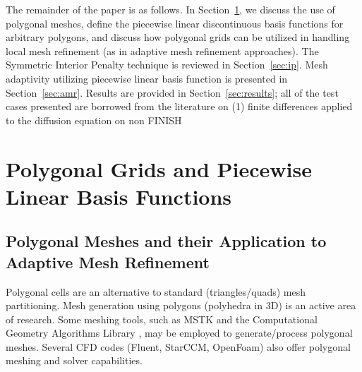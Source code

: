 \documentclass[preprint,10pt]{elsarticle}
\newcommand{\sct}[1]{Section~\ref{#1}}                   %
\begin{document}
The remainder of the paper is as follows. In \sct{sec:poly}, we discuss
the use of polygonal meshes, define the piecewise linear discontinuous 
basis functions for arbitrary polygons, and discuss how polygonal grids
can be utilized in handling local mesh refinement (as in adaptive mesh refinement 
approaches). The Symmetric Interior Penalty technique is reviewed in \sct{sec:ip}.
Mesh adaptivity utilizing piecewise linear basis function is presented in 
\sct{sec:amr}. Results are provided in \sct{sec:results}; all of the test cases presented
are borrowed from the literature on (1) finite differences applied to the
diffusion equation on non FINISH 

\section{Polygonal Grids and Piecewise Linear Basis Functions} \label{sec:poly}
\subsection{Polygonal Meshes and their Application to Adaptive Mesh Refinement}

Polygonal cells are an alternative to standard (triangles/quads) mesh partitioning.
Mesh generation using polygons (polyhedra in 3D) is an active area of research.
Some meshing tools, such as MSTK \cite{mstk} and the Computational Geometry Algorithms 
Library \cite{cgal}, may be employed to generate/process polygonal meshes.  
Several CFD codes (Fluent, StarCCM, OpenFoam) also offer polygonal meshing and solver capabilities. 
\end{document}

